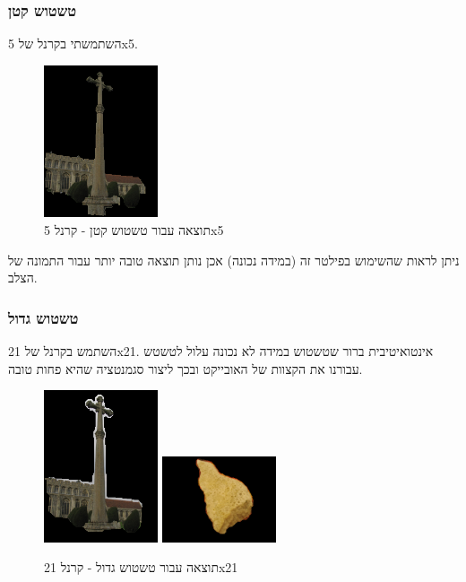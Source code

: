 \documentclass[a4paper,12pt]{article}
\begin{document}
\subsubsection{טשטוש קטן}
השתמשתי בקרנל של 5x5.
\begin{figure}[H]
    \centering
    \includegraphics[width=0.3\textwidth]{my_reasults/smallblur/cross_result.png}
    \caption{תוצאה עבור טשטוש קטן - קרנל 5x5}
\end{figure}
ניתן לראות שהשימוש בפילטר זה (במידה נכונה) אכן נותן תוצאה טובה יותר עבור התמונה של הצלב.

\subsubsection{טשטוש גדול}
השתמש בקרנל של 21x21. אינטואיטיבית ברור שטשטוש במידה לא נכונה עלול לטשטש עבורנו את הקצוות של האובייקט ובכך ליצור סגמנטציה שהיא פחות טובה.
\begin{figure}[H]
    \centering
    \includegraphics[width=0.3\textwidth]{my_reasults/highblur/cross_result.png}
    \includegraphics[width=0.3\textwidth]{my_reasults/highblur/stone2_result.png}
    \caption{תוצאה עבור טשטוש גדול - קרנל 21x21}
\end{figure}
\end{document}
